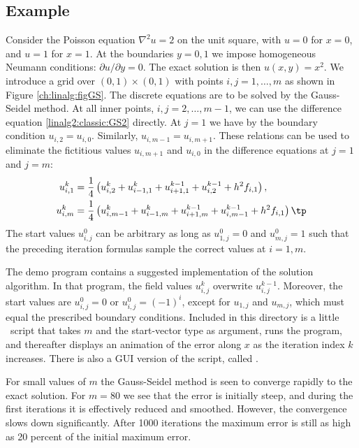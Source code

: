 \subsection{Example}
\label{ch:linalg:examp1}

Consider the Poisson
equation $\nabla^2 u=2$ on the unit square, with $u=0$ for $x=0$, and
$u=1$ for $x=1$. At the boundaries $y=0,1$ we impose homogeneous
Neumann conditions: $\partial u/\partial y = 0$.
The exact solution is then $u(x,y)=x^2$.
We introduce a grid over $(0,1)\times (0,1)$
with points $i,j=1,\ldots,m$ as shown in
Figure \ref{ch:linalg:figGS}.
The discrete equations are to be solved by the Gauss-Seidel method.
At all inner points, $i,j=2,\ldots,m-1$, we can use the difference equation
\eqref{linalg2:classic:GS2} directly.
At $j=1$ we have by the boundary condition $u_{i,2}=u_{i,0}$.
Similarly, $u_{i,m-1} = u_{i,m+1}$.
These relations can be used to eliminate the fictitious values
$u_{i,m+1}$ and $u_{i,0}$ in the difference equations at $j=1$ and $j=m$:
\begin{align*}
u^{k}_{i,1} &= {1\over4}\left(
u^{k}_{i,2} + u^{k}_{i-1,1} + u^{k-1}_{i+1,1} + u^{k-1}_{i,2}
+ h^2f_{i,1}\right),\\
u^{k}_{i,m} &= {1\over4}\left(
u^{k}_{i,m-1} + u^{k}_{i-1,m} + u^{k-1}_{i+1,m} + u^{k-1}_{i,m-1}
+ h^2f_{i,1}\right) \tp
\end{align*}
The start values $u^0_{i,j}$ can be arbitrary as long as
$u^0_{1,j}=0$ and $u^0_{m,j}=1$ such that the preceding iteration formulas
sample the correct values at $i=1,m$.

The demo program  contains a
suggested implementation of the solution algorithm.  In that program,
the field values $u^{k}_{i,j}$ overwrite $u^{k-1}_{i,j}$.  Moreover,
the start values are $u_{i,j}^0=0$ or $u_{i,j}^0=(-1)^i$, except for
$u_{1,j}$ and $u_{m,j}$, which must equal the prescribed boundary
conditions.  Included in this directory is a little \perl\ script
 that takes $m$ and the start-vector type as argument,
runs the program, and thereafter displays an animation of the error
along $x$ as the iteration index $k$ increases. There is also a GUI
version of the script, called .

For small values of $m$ the Gauss-Seidel method is seen to converge
rapidly to the exact solution.  For $m=80$ we see that the error is
initially steep, and during the first iterations it is effectively
reduced and smoothed. However, the convergence slows down
significantly.  After 1000 iterations the maximum error is still as
high as 20 percent of the initial maximum error.

